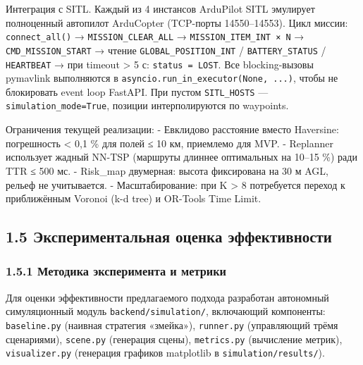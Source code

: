 \documentclass[14pt,a4paper]{extarticle}
\begin{document}
Интеграция с SITL. Каждый из 4 инстансов ArduPilot SITL эмулирует полноценный автопилот ArduCopter (TCP-порты 14550--14553). Цикл миссии: \texttt{connect\_all()} → \texttt{MISSION\_CLEAR\_ALL} → \texttt{MISSION\_ITEM\_INT\ ×\ N} → \texttt{CMD\_MISSION\_START} → чтение \texttt{GLOBAL\_POSITION\_INT} / \texttt{BATTERY\_STATUS} / \texttt{HEARTBEAT} → при timeout \textgreater{} 5 с: \texttt{status\ =\ LOST}. Все blocking-вызовы pymavlink выполняются в \texttt{asyncio.run\_in\_executor(None,\ ...)}, чтобы не блокировать event loop FastAPI. При пустом \texttt{SITL\_HOSTS} --- \texttt{simulation\_mode=True}, позиции интерполируются по waypoints.

Ограничения текущей реализации: - Евклидово расстояние вместо Haversine: погрешность \textless{} 0,1 \% для полей ≤ 10 км, приемлемо для MVP. - Replanner использует жадный NN-TSP (маршруты длиннее оптимальных на 10--15 \%) ради TTR ≤ 500 мс. - Risk\_map двумерная: высота фиксирована на 30 м AGL, рельеф не учитывается. - Масштабирование: при K \textgreater{} 8 потребуется переход к приближённым Voronoi (k-d tree) и OR-Tools Time Limit.


\hypertarget{ux44dux43aux441ux43fux435ux440ux438ux43cux435ux43dux442ux430ux43bux44cux43dux430ux44f-ux43eux446ux435ux43dux43aux430-ux44dux444ux444ux435ux43aux442ux438ux432ux43dux43eux441ux442ux438}{%
\subsection{1.5 Экспериментальная оценка эффективности}\label{ux44dux43aux441ux43fux435ux440ux438ux43cux435ux43dux442ux430ux43bux44cux43dux430ux44f-ux43eux446ux435ux43dux43aux430-ux44dux444ux444ux435ux43aux442ux438ux432ux43dux43eux441ux442ux438}}

\hypertarget{ux43cux435ux442ux43eux434ux438ux43aux430-ux44dux43aux441ux43fux435ux440ux438ux43cux435ux43dux442ux430-ux438-ux43cux435ux442ux440ux438ux43aux438}{%
\subsubsection{1.5.1 Методика эксперимента и метрики}\label{ux43cux435ux442ux43eux434ux438ux43aux430-ux44dux43aux441ux43fux435ux440ux438ux43cux435ux43dux442ux430-ux438-ux43cux435ux442ux440ux438ux43aux438}}

Для оценки эффективности предлагаемого подхода разработан автономный симуляционный модуль \texttt{backend/simulation/}, включающий компоненты: \texttt{baseline.py} (наивная стратегия «змейка»), \texttt{runner.py} (управляющий трёмя сценариями), \texttt{scene.py} (генерация сцены), \texttt{metrics.py} (вычисление метрик), \texttt{visualizer.py} (генерация графиков matplotlib в \texttt{simulation/results/}).
\end{document}
